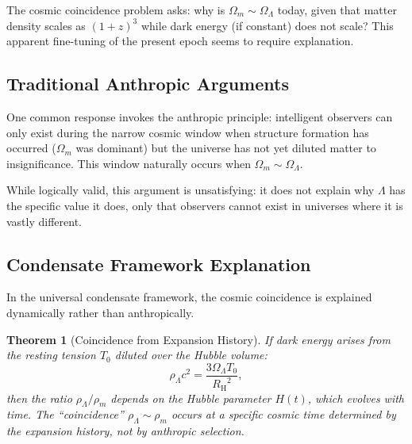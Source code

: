\documentclass[11pt,a4paper]{article}
\newcommand{\Tzero}{\ensuremath{T_0}}
\newcommand{\RH}{\ensuremath{R_{\mathrm{H}}}}
\newcommand{\OmegaLam}{\ensuremath{\Omega_\Lambda}}
\newcommand{\OmegaM}{\ensuremath{\Omega_m}}
\newtheorem{theorem}{Theorem}[section]
\theoremstyle{definition}
\theoremstyle{remark}
\begin{document}
The cosmic coincidence problem asks: why is $\OmegaM \sim \OmegaLam$ today, given that matter density scales as $(1+z)^3$ while dark energy (if constant) does not scale? This apparent fine-tuning of the present epoch seems to require explanation.

\subsection{Traditional Anthropic Arguments}
\label{sec:anthropic}

One common response invokes the anthropic principle: intelligent observers can only exist during the narrow cosmic window when structure formation has occurred ($\OmegaM$ was dominant) but the universe has not yet diluted matter to insignificance. This window naturally occurs when $\OmegaM \sim \OmegaLam$.

While logically valid, this argument is unsatisfying: it does not explain why $\Lambda$ has the specific value it does, only that observers cannot exist in universes where it is vastly different.

\subsection{Condensate Framework Explanation}
\label{sec:condensate_explanation}

In the universal condensate framework, the cosmic coincidence is explained dynamically rather than anthropically.

\begin{theorem}[Coincidence from Expansion History]
\label{thm:coincidence}
If dark energy arises from the resting tension $\Tzero$ diluted over the Hubble volume:
\begin{equation}
\rho_\Lambda c^2 = \frac{3\OmegaLam \Tzero}{\RH^2},
\end{equation}
then the ratio $\rho_\Lambda/\rho_m$ depends on the Hubble parameter $H(t)$, which evolves with time. The ``coincidence'' $\rho_\Lambda \sim \rho_m$ occurs at a specific cosmic time determined by the expansion history, not by anthropic selection.
\end{theorem}
\end{document}
